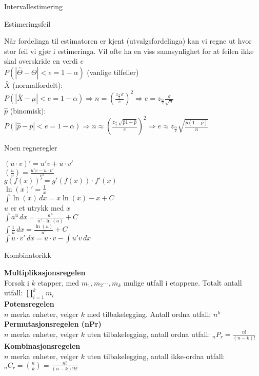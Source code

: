 \documentclass[final,hyperref={pdfpagelabels=false}]{beamer}
\newcommand{\body}[1]{\footnotesize\raggedright{#1}\par}
\newcommand{\subsect}[1]{\center\normalsize{#1}\\}
\begin{document}
\begin{frame}{}
\begin{columns}[t]
\begin{column}{.25\linewidth}
\begin{block}{\center Intervallestimering}
{\begin{enumerate}
					\end{enumerate}
				}
				\subsect{Estimeringsfeil}
				\body{Når fordelinga til estimatoren er kjent (utvalgsfordelinga) kan vi regne ut hvor stor feil vi gjør i estimeringa. Vil ofte ha en viss sannsynlighet for at feilen ikke skal overskride en verdi $e$\\
					$P(|\hat\Theta-\Theta|<e=1-\alpha)$ (vanlige tilfeller)\\
					$\bar X$ (normalfordelt):\\
					$P(|\bar X - \mu|<e=1-\alpha) \Rightarrow n=\left( \frac{z_\frac{\alpha}{2}\sigma}{e}\right)^2\Rightarrow e=z_\frac{\alpha}{2}\frac{\sigma}{\sqrt n}$\\
					$\hat p$ (binomisk):\\
					$P(|\hat p - p| < e=1-\alpha)\Rightarrow n\approx \left(\frac{z_\frac{\alpha}{2}\sqrt{\hat p {1-\hat p}}}{e}\right)^2\Rightarrow e\approx z_\frac{\alpha}{2}\sqrt{\frac{\hat p(1 - \hat p)}{n}}$}
				\subsect{Noen regneregler}
				\body{
					$(u\cdot v)' = u'v + u\cdot v'$\\
					$\left( \frac{u}{v}\right) = \frac{u'v - u\cdot v'}{v^2}$\\
					$g(f(x))'=g'(f(x))\cdot f'(x)$\\
					$\ln(x)'=\frac{1}{x}$\\
					$\int \ln (x) \, dx=x\ln (x) -x + C$ \\
					$u$ er et utrykk med $x$\\
					$\int a^u \, dx = \frac{a^u}{u'\cdot \ln(a)} + C$\\
					$\int \frac{1}{u} \,dx = \frac{\ln(u)}{u'} + C$ \\
					$\int u \cdot v' \, dx = u\cdot v-\int u'v \, dx$
				}
				\subsect{Kombinatorikk}
				\body{\textbf{Multiplikasjonsregelen}\\
					Forsøk i $k$ etapper, med $m_1,m_2 \cdots,m_k$ mulige utfall i etappene. Totalt antall utfall: $\prod_{i=1}^k m_i$\\
					\textbf{Potensregelen}\\
					$n$ merka enheter, velger $k$ med tilbakelegging. Antall ordna utfall: $n^k$\\
					\textbf{Permutasjonsregelen (nPr)}\\
					$n$ merka enheter, velger $k$ uten tilbakelegging, antall ordna utfall: $_nP_r=\frac{n!}{(n-k)!}$\\
					\textbf{Kombinasjonsregelen}\\
					$n$ merka enheter, velger $k$ uten tilbakelegging, antall ikke-ordna utfall: $_nC_r=\binom{n}{k}=\frac{n!}{(n-k)!k!}$\\}

\end{block}
\end{column}
\end{columns}
\end{frame}
\end{document}
